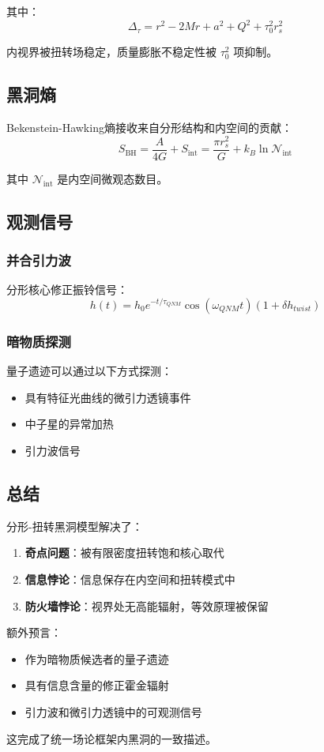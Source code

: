 其中：
\begin{equation}
    \Delta_\tau = r^2 - 2Mr + a^2 + Q^2 + \tau_0^2 r_s^2
\end{equation}

内视界被扭转场稳定，质量膨胀不稳定性被 $\tau_0^2$ 项抑制。

\subsection{黑洞熵}

Bekenstein-Hawking熵接收来自分形结构和内空间的贡献：
\begin{equation}
    S_{\text{BH}} = \frac{A}{4G} + S_{\text{int}} = \frac{\pi r_s^2}{G} + k_B \ln \mathcal{N}_{\text{int}}
\end{equation}

其中 $\mathcal{N}_{\text{int}}$ 是内空间微观态数目。

\subsection{观测信号}

\subsubsection{并合引力波}

分形核心修正振铃信号：
\begin{equation}
    h(t) = h_0 e^{-t/\tau_{QNM}} \cos(\omega_{QNM}t)(1 + \delta h_{twist})
\end{equation}

\subsubsection{暗物质探测}

量子遗迹可以通过以下方式探测：
\begin{itemize}
    \item 具有特征光曲线的微引力透镜事件
    \item 中子星的异常加热
    \item 引力波信号
\end{itemize}

\subsection{总结}

分形-扭转黑洞模型解决了：
\begin{enumerate}
    \item \textbf{奇点问题}：被有限密度扭转饱和核心取代
    \item \textbf{信息悖论}：信息保存在内空间和扭转模式中
    \item \textbf{防火墙悖论}：视界处无高能辐射，等效原理被保留
\end{enumerate}

额外预言：
\begin{itemize}
    \item 作为暗物质候选者的量子遗迹
    \item 具有信息含量的修正霍金辐射
    \item 引力波和微引力透镜中的可观测信号
\end{itemize}

这完成了统一场论框架内黑洞的一致描述。
